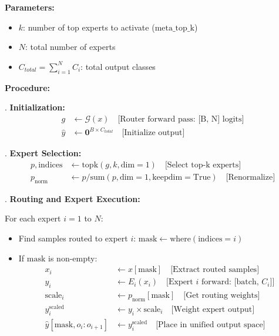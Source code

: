 \documentclass[11pt,a4paper]{article}
\begin{document}
\textbf{Parameters:}
\begin{itemize}
    \item $k$: number of top experts to activate ($\text{meta\_top\_k}$)
    \item $N$: total number of experts
    \item $C_{total} = \sum_{i=1}^N C_i$: total output classes
\end{itemize}

\textbf{Procedure:}

. \textbf{Initialization:}
\begin{align}
    g &\leftarrow \mathcal{G}(x) \quad \text{[Router forward pass: [B, N] logits]} \\
    \hat{y} &\leftarrow \mathbf{0}^{B \times C_{total}} \quad \text{[Initialize output]}
\end{align}

. \textbf{Expert Selection:}
\begin{align}
    p, \text{indices} &\leftarrow \text{topk}(g, k, \text{dim}=1) \quad \text{[Select top-k experts]} \\
    p_{\text{norm}} &\leftarrow p / \text{sum}(p, \text{dim}=1, \text{keepdim}=\text{True}) \quad \text{[Renormalize]}
\end{align}

. \textbf{Routing and Expert Execution:}

For each expert $i = 1$ to $N$:
\begin{itemize}
    \item Find samples routed to expert $i$: $\text{mask} \leftarrow \text{where}(\text{indices} = i)$
    \item If $\text{mask}$ is non-empty:
    \begin{align}
        x_i &\leftarrow x[\text{mask}] \quad \text{[Extract routed samples]} \\
        y_i &\leftarrow E_i(x_i) \quad \text{[Expert $i$ forward: [batch, $C_i$]]} \\
        \text{scale}_i &\leftarrow p_{\text{norm}}[\text{mask}] \quad \text{[Get routing weights]} \\
        y_i^{\text{scaled}} &\leftarrow y_i \times \text{scale}_i \quad \text{[Weight expert output]} \\
        \hat{y}[\text{mask}, o_i:o_{i+1}] &\leftarrow y_i^{\text{scaled}} \quad \text{[Place in unified output space]}
    \end{align}
\end{itemize}
\end{document}
